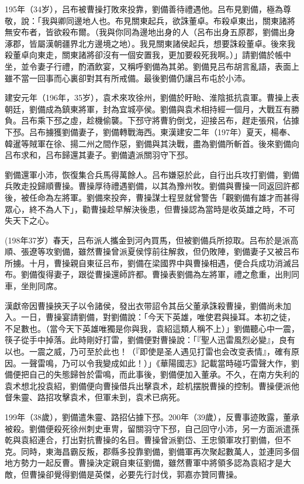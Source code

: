 195年（34岁），吕布被曹操打敗來投靠，劉備善待禮遇他。吕布見劉備，極為尊敬，說：「我與卿同邊地人也。布見關東起兵，欲誅董卓。布殺卓東出，關東諸將無安布者，皆欲殺布爾。（我與你同為邊地出身的人（呂布出身五原郡，劉備出身涿郡，皆屬漢朝疆界北方邊境之地）。我見關東諸侯起兵，想要誅殺董卓。後來我殺董卓向東走，關東諸將卻沒有一個安置我，更加要殺死我啊。）」請劉備於帳中坐，並令妻子行禮，酌酒飲宴，又稱呼劉備為其弟。劉備見吕布胡言亂語，表面上雖不當一回事而心裏卻對其有所戒備。最後劉備仍讓吕布屯於小沛。

建安元年（196年，35岁），袁术來攻徐州，劉備於盱眙、淮陰抵抗袁軍。曹操上表朝廷，劉備成為鎮東將軍，封為宜城亭侯。劉備與袁术相持經一個月，大戰互有勝負。吕布乘下邳之虛，趁機偷襲。下邳守將曹豹倒戈，迎接呂布，趕走張飛，佔據下邳。吕布擄獲劉備妻子，劉備轉戰海西。東漢建安二年（197年）夏天，楊奉、韓暹等賊軍在徐、揚二州之間作惡，劉備與其決戰，盡為劉備所斬首。後來劉備向吕布求和，吕布歸還其妻子。劉備遺派關羽守下邳。

劉備還軍小沛，恢復集合兵馬得萬餘人。吕布嫌惡於此，自行出兵攻打劉備，劉備兵敗走投歸順曹操。曹操厚待禮遇劉備，以其為豫州牧。劉備與曹操一同返回許都後，被任命為左將軍。劉備來投奔，曹操謀士程昱就曾警告「觀劉備有雄才而甚得眾心，終不為人下」，勸曹操趁早解決後患，但曹操認為當時是收英雄之時，不可失天下之心。

(198年37岁）春天，吕布派人攜金到河內買馬，但被劉備兵所掠取。吕布於是派高順、張遼等攻劉備，雖然曹操曾派夏侯惇前往解救，但仍敗陣，劉備妻子又被吕布所擄。十月，曹操親自東征吕布，劉備在梁國界中與曹操相遇，便合兵成功消滅吕布。劉備復得妻子，跟從曹操還師許都。曹操表劉備為左將軍，禮之愈重，出則同車，坐則同席。

漢獻帝因曹操挾天子以令諸侯，發出衣带詔令其岳父董承誅殺曹操，劉備尚未加入。一日，曹操宴請劉備，對劉備說：「今天下英雄，唯使君與操耳。本初之徒，不足數也。（當今天下英雄唯獨是你與我，袁紹這類人稱不上）」劉備聽心中一震，筷子從手中掉落。此時剛好打雷，劉備便對曹操說：「『聖人迅雷風烈必變』，良有以也。一震之威，乃可至於此也！（『即使是圣人遇见打雷也会改变表情』，確有原因。一聲雷鳴，乃可以令我變成如此！）」《華陽國志》記載當時碰巧雷聲大作，劉備便把自己的失態歸咎於雷鳴，而此事後，劉備便加入董承。不久，在南方失利的袁术想北投袁紹，劉備便向曹操借兵出擊袁术，趁机摆脱曹操的控制。曹操便派他督朱靈、路招攻擊袁术，但軍未到，袁术已病死。

199年（38歲），劉備遣朱靈、路招佔據下邳。200年（39歲），反曹事迹敗露，董承被殺。劉備便殺死徐州刺史車冑，留關羽守下邳，自己回守小沛，另一方面派遣孫乾與袁紹連合，打出對抗曹操的名目。曹操曾派劉岱、王忠領軍攻打劉備，但不克。同時，東海昌霸反叛，郡縣多投靠劉備，劉備軍再次聚起數萬人，並連同多個地方勢力一起反曹。曹操決定親自東征劉備，雖然曹軍中將領多認為袁紹才是大敵，但曹操卻覺得劉備是英傑，必要先行討伐，郭嘉亦贊同曹操。

